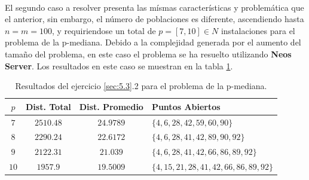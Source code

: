 \documentclass[spanish]{article}
\begin{document}
			\paragraph{}
			El segundo caso a resolver presenta las mísmas características y problemática que el anterior, sin embargo, el número de poblaciones es diferente, ascendiendo hasta $n = m = 100$, y requiriendose un total de $p = [7,10] \in N$ instalaciones para el problema de la p-mediana. Debido a la complejidad generada por el aumento del tamaño del problema, en este caso el problema se ha resuelto utilizando \textbf{Neos Server}\cite{tool:neos-server}. Los resultados en este caso se muestran en la tabla \ref{table:sol-5.3.2}.

			\begin{table}[h]
				\begin{center}
					\begin{tabular}{|c || c || c || l | }
						\hline
						$p$		& Dist. Total 	& Dist. Promedio	& Puntos Abiertos	 \\ \hline \hline
						$7$ 	& $2510.48$ 		& $24.9789$				& $\{4,6,28,42,59,60,90\}$ \\ \hline
						$8$ 	& $2290.24$ 		& $22.6172$				& $\{4,6,28,41,42,89,90,92\}$ \\ \hline
						$9$ 	& $2122.31$ 		& $21.039$				& $\{4,6,28,41,42,66,86,89,92\}$ \\ \hline
						$10$ 	& $1957.9$ 			& $19.5009$				& $\{4,15,21,28,41,42,66,86,89,92\}$ \\
						\hline
					\end{tabular}
				\end{center}
				\caption{Resultados del ejercicio \ref{sec:5.3}.2 para el problema de la p-mediana.}
				\label{table:sol-5.3.2}
			\end{table}


	\nocite{subject:mio}
	
  
\end{document}
